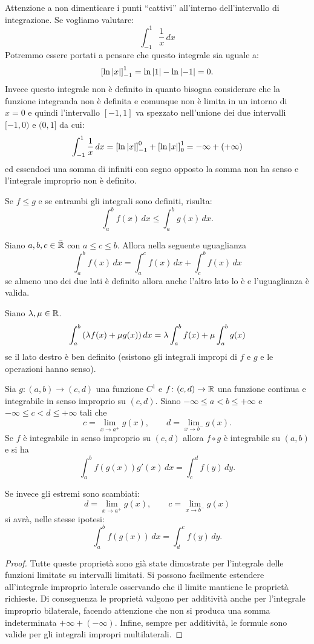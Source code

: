 \begin{remark}
Attenzione a non dimenticare i punti ``cattivi'' all'interno dell'intervallo
di integrazione. Se vogliamo valutare:
\[
  \int_{-1}^1 \frac{1}{x}\, dx
\]
Potremmo essere portati a pensare che questo integrale sia uguale a:
\[
 {\left[ \ln {\left|x\right|} \right]}_{-1}^1 = \ln {\left|1\right|} - \ln {\left|-1\right|} = 0.
\]
Invece questo integrale non è definito in quanto bisogna considerare
che la funzione integranda non è definita e comunque non è limita in un
intorno di $x=0$ e quindi l'intervallo $[-1,1]$ va spezzato nell'unione
dei due intervalli $[-1,0)$ e $(0,1]$ da cui:
\[
  \int_{-1}^1 \frac{1}{x}\, dx = {\left[ \ln {\left|x\right|} \right]}_{-1}^0 + {\left[ \ln{\left|x\right|} \right]}_0^{1}
   = -\infty + (+\infty)
\]
ed essendoci una somma di infiniti con segno opposto la somma non ha senso
e l'integrale improprio non è definito.
\end{remark}

\begin{theorem}
\label{th:proprieta_integrale_improprio}
Se $f\le g$ e se entrambi gli integrali sono definiti, risulta:
\[
  \int_a^b f(x)\, dx \le \int_a^b g(x)\, dx.
\]

Siano $a,b,c \in \bar {\mathbb R}$ con $a\le c \le b$.
Allora nella seguente uguaglianza
\[
  \int_a^b f(x)\, dx = \int_a^c f(x)\, dx + \int_c^b f(x)\, dx
\]
se almeno uno dei due lati è definito allora anche l'altro lato lo è e
l'uguaglianza è valida.

Siano $\lambda, \mu \in \mathbb R$.
\[
  \int_a^b {\left( \lambda f(x) + \mu g(x) \right)}\, dx
  = \lambda \int_a^b f(x) + \mu \int_a^b g(x)
\]
se il lato destro è ben definito (esistono gli integrali impropi di $f$ e $g$
e le operazioni hanno senso).

Sia $g\colon (a,b)\to (c,d)$ una funzione $C^1$
e $f\colon (c,d) \to \mathbb R$ una funzione continua
e integrabile in senso improprio su $(c,d)$.
Siano $-\infty \le a < b \le +\infty$ e
$-\infty \le c < d \le +\infty$ tali che
\[
c = \lim_{x\to a^+} g(x),
\qquad
d = \lim_{x\to b^-} g(x).
\]
Se $f$ è integrabile in senso improprio su $(c,d)$
allora $f \circ g$ è integrabile su $(a,b)$ e
si ha
\[
\int_a^b f(g(x)) g'(x)\, dx = \int_c^d f(y)\, dy.
\]

Se invece gli estremi sono scambiati:
\[
d = \lim_{x\to a^+} g(x),
\qquad
c = \lim_{x\to b^-} g(x)
\]
si avrà, nelle stesse ipotesi:
\[
  \int_a^b f(g(x))\, dx = \int_d^c f(y)\, dy.
\]
\end{theorem}
%
\begin{proof}
Tutte queste proprietà sono già state dimostrate per l'integrale delle funzioni
limitate su intervalli limitati. Si possono facilmente estendere all'integrale
improprio laterale osservando che il limite mantiene le proprietà richieste.
Di conseguenza le proprietà valgono per additività anche per l'integrale
improprio bilaterale, facendo attenzione che non si produca una somma
indeterminata $+\infty + (-\infty)$.
Infine, sempre per additività, le formule sono valide per gli integrali
impropri multilaterali.
\end{proof}

